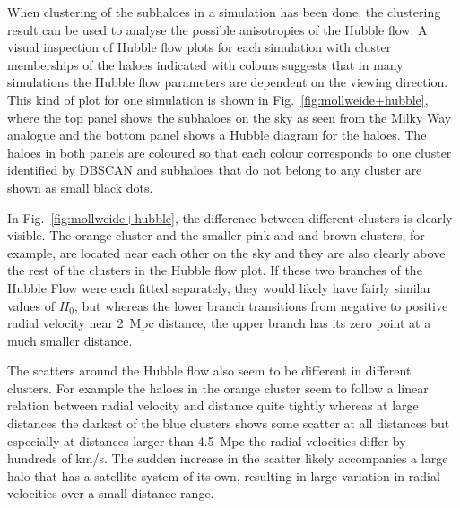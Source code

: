 \documentclass[english, oneside]{HYgradu}
\begin{document}
When clustering of the subhaloes in a simulation has been done, the clustering result can be used to analyse the possible anisotropies of the Hubble flow. A visual inspection of Hubble flow plots for each simulation with cluster memberships of the haloes indicated with colours suggests that in many simulations the Hubble flow parameters are dependent on the viewing direction. This kind of plot for one simulation is shown in Fig.~\ref{fig:mollweide+hubble}, where the top panel shows the subhaloes on the sky as seen from the Milky Way analogue and the bottom panel shows a Hubble diagram for the haloes. The haloes in both panels are coloured so that each colour corresponds to one cluster identified by DBSCAN and subhaloes that do not belong to any cluster are shown as small black dots. 

In Fig.~\ref{fig:mollweide+hubble}, the difference between different clusters is clearly visible. The orange cluster and the smaller pink and and brown clusters, for example, are located near each other on the sky and they are also clearly above the rest of the clusters in the Hubble flow plot. If these two branches of the Hubble Flow were each fitted separately, they would likely have fairly similar values of $H_0$, but whereas the lower branch transitions from negative to positive radial velocity near 2~Mpc distance, the upper branch has its zero point at a much smaller distance.

The scatters around the Hubble flow also seem to be different in different clusters. For example the haloes in the orange cluster seem to follow a linear relation between radial velocity and distance quite tightly whereas at large distances the darkest of the blue clusters shows some scatter at all distances but especially at distances larger than 4.5~Mpc the radial velocities differ by hundreds of km/s. The sudden increase in the scatter likely accompanies a large halo that has a satellite system of its own, resulting in large variation in radial velocities over a small distance range.

\end{document}
